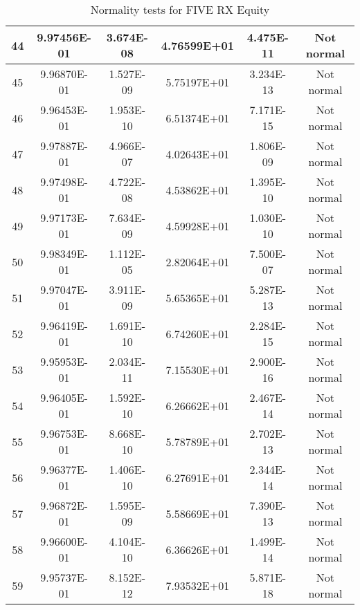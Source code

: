 \begin{table}[h]
\begin{tabular}{|c|c|c|c|c|c|}
		44 & 9.97456E-01 & 3.674E-08 & 4.76599E+01 & 4.475E-11 & Not normal\\\hline
		45 & 9.96870E-01 & 1.527E-09 & 5.75197E+01 & 3.234E-13 & Not normal\\\hline
		46 & 9.96453E-01 & 1.953E-10 & 6.51374E+01 & 7.171E-15 & Not normal\\\hline
		47 & 9.97887E-01 & 4.966E-07 & 4.02643E+01 & 1.806E-09 & Not normal\\\hline
		48 & 9.97498E-01 & 4.722E-08 & 4.53862E+01 & 1.395E-10 & Not normal\\\hline
		49 & 9.97173E-01 & 7.634E-09 & 4.59928E+01 & 1.030E-10 & Not normal\\\hline
		50 & 9.98349E-01 & 1.112E-05 & 2.82064E+01 & 7.500E-07 & Not normal\\\hline
		51 & 9.97047E-01 & 3.911E-09 & 5.65365E+01 & 5.287E-13 & Not normal\\\hline
		52 & 9.96419E-01 & 1.691E-10 & 6.74260E+01 & 2.284E-15 & Not normal\\\hline
		53 & 9.95953E-01 & 2.034E-11 & 7.15530E+01 & 2.900E-16 & Not normal\\\hline
		54 & 9.96405E-01 & 1.592E-10 & 6.26662E+01 & 2.467E-14 & Not normal\\\hline
		55 & 9.96753E-01 & 8.668E-10 & 5.78789E+01 & 2.702E-13 & Not normal\\\hline
		56 & 9.96377E-01 & 1.406E-10 & 6.27691E+01 & 2.344E-14 & Not normal\\\hline
		57 & 9.96872E-01 & 1.595E-09 & 5.58669E+01 & 7.390E-13 & Not normal\\\hline
		58 & 9.96600E-01 & 4.104E-10 & 6.36626E+01 & 1.499E-14 & Not normal\\\hline
		59 & 9.95737E-01 & 8.152E-12 & 7.93532E+01 & 5.871E-18 & Not normal\\\hline
	\end{tabular}
	\caption{Normality tests for FIVE RX Equity}
	\label{tab:normality_tests_FIVE_RX}
\end{table}
